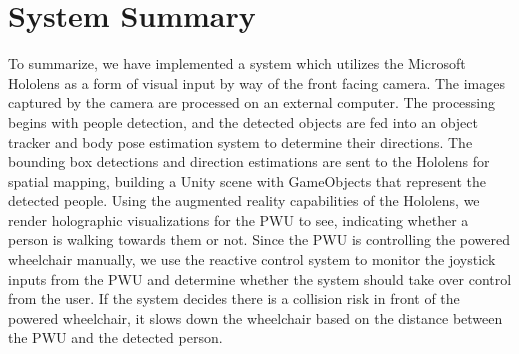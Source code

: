 \section{System Summary}
To summarize, we have implemented a system which utilizes the Microsoft Hololens as a form of visual input by way of the front facing camera. The images captured by the camera are processed on an external computer. The processing begins with people detection, and the detected objects are fed into an object tracker and body pose estimation system to determine their directions. The bounding box detections and direction estimations are sent to the Hololens for spatial mapping, building a Unity scene with GameObjects that represent the detected people. Using the augmented reality capabilities of the Hololens, we render holographic visualizations for the PWU to see, indicating whether a person is walking towards them or not. Since the PWU is controlling the powered wheelchair manually, we use the reactive control system to monitor the joystick inputs from the PWU and determine whether the system should take over control from the user. If the system decides there is a collision risk in front of the powered wheelchair, it slows down the wheelchair based on the distance between the PWU and the detected person.